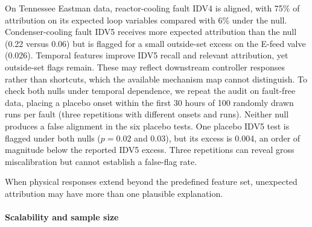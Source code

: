 \documentclass[conference]{IEEEtran}
\begin{document}
On Tennessee Eastman data, reactor-cooling fault IDV4 is aligned, with 75\% of attribution on its expected loop variables compared with 6\% under the null. Condenser-cooling fault IDV5 receives more expected attribution than the null (0.22 versus 0.06) but is flagged for a small outside-set excess on the E-feed valve (0.026). Temporal features improve IDV5 recall and relevant attribution, yet outside-set flags remain. These may reflect downstream controller responses rather than shortcuts, which the available mechanism map cannot distinguish. To check both nulls under temporal dependence, we repeat the audit on fault-free data, placing a placebo onset within the first 30 hours of 100 randomly drawn runs per fault (three repetitions with different onsets and runs). Neither null produces a false alignment in the six placebo tests. One placebo IDV5 test is flagged under both nulls ($p=0.02$ and $0.03$), but its excess is 0.004, an order of magnitude below the reported IDV5 excess. Three repetitions can reveal gross miscalibration but cannot establish a false-flag rate.

When physical responses extend beyond the predefined feature set, unexpected attribution may have more than one plausible explanation.

\paragraph{Scalability and sample size}
\label{sec:scale}

\begin{table}[t]
\centering
\caption{Verdicts on generated data of increasing size ($K=200$): numbers of runs aligned (A), not aligned (N), and flagged (F). Share denotes planted-sensor attribution; Min. denotes minutes per full audit on eight cores.}
\label{tab:scale}
\footnotesize
\setlength{\tabcolsep}{3pt}

\end{table}
\end{document}
